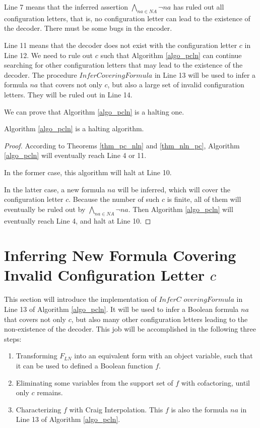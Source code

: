 \documentclass{sig-alternate}
\begin{document}
Line 7 means that the inferred assertion $\bigwedge_{na\in NA}\neg na$ has ruled out all configuration letters,
that is,
no configuration letter can lead to the existence of the decoder.
There must be some bugs in the encoder.

Line 11 means that the decoder does not exist with the configuration letter $c$ in Line 12.
We need to rule out $c$ such that Algorithm \ref{algo_pcln} can continue searching for other configuration letters that may lead to the existence of the decoder.
The procedure $InferCoveringFormula$ in Line 13 will be used to infer a formula $na$ that covers not only $c$,
but also a large set of invalid configuration letters.
They will be ruled out in Line 14.

We can prove that Algorithm \ref{algo_pcln} is a halting one.
\begin{theorem}[]\label{thm_pcln_halt}
Algorithm \ref{algo_pcln} is a halting algorithm.
\end{theorem}
\begin{proof}
According to Theorems \ref{thm_pc_nln} and \ref{thm_nln_pc},
Algorithm \ref{algo_pcln} will eventually reach Line 4 or 11.

In the former case,
this algorithm will halt at Line 10.

In the latter case,
a new formula $na$ will be inferred,
which will cover the configuration letter $c$.
Because the number of such $c$ is finite,
all of them will eventually be ruled out by $\bigwedge_{na\in NA}\neg na$.
Then Algorithm \ref{algo_pcln} will eventually reach Line 4,
and halt at Line 10.

\end{proof}

\section{Inferring New Formula Covering Invalid Configuration Letter $c$}\label{sec_infer}
This section will introduce the implementation of $InferC$ $overingFormula$ in Line 13 of Algorithm \ref{algo_pcln}.
It will be used to infer a Boolean formula $na$
that covers not only $c$,
but also many other configuration letters leading to the non-existence of the decoder.
This job will be accomplished in the following three steps:
\begin{enumerate}
 \item Transforming $F_{LN}$ into an equivalent form with an object variable,
       such that it can be used to defined a Boolean function $f$.
 \item Eliminating some variables from the support set of $f$ with cofactoring\cite{Cofact},
       until only $c$ remains.
 \item Characterizing $f$ with Craig Interpolation.
       This $f$ is also the formula $na$ in Line 13 of Algorithm \ref{algo_pcln}.
\end{enumerate}
\end{document}
